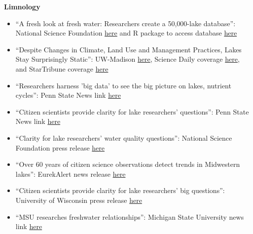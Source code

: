 \documentclass[10pt]{article}
\begin{document}
\begin{flushleft}
\textbf{Limnology}\\
\begin{itemize}
\item ``A fresh look at fresh water: Researchers create a 50,000-lake database'': National Science Foundation \href{https://www.nsf.gov/news/news_summ.jsp?cntn_id=243391&org=NSF&from=news}{here} and R package to access database \href{https://github.com/cont-limno/LAGOSNE}{here} 
\item ``Despite Changes in Climate, Land Use and Management Practices, Lakes Stay Surprisingly Static'': UW-Madison  \href{http://blog.limnology.wisc.edu/despite-changes-in-climate-land-use-and-management-practices-lakes-stay-surprisingly-static/}{here}, Science Daily coverage  \href{https://www.sciencedaily.com/releases/2017/08/170823184403.htm}{here}, and StarTribune coverage \href{http://m.startribune.com/minnesota-lakes-holding-their-own-against-pollution/441820303/?section=local}{here}
\item ``Researchers harness 'big data' to see the big picture on lakes, nutrient cycles'': Penn State News link \href{http://news.psu.edu/story/425689/2016/09/13/research/researchers-harness-big-data-see-big-picture-lakes-nutrient-cycles}{here}\\
\item ``Citizen scientists provide clarity for lake researchers' questions'': Penn State News link
\href{http://news.psu.edu/story/314178/2014/04/30/research/citizen-scientists-provide-clarity-lake-researchers-questions}{here} \\
\item ``Clarity for lake researchers' water quality questions'': National Science Foundation press release
\href{http://www.nsf.gov/discoveries/disc_summ.jsp?cntn_id=131238&org=NSF&from=news}{here} \\
\item ``Over 60 years of citizen science observations detect trends in Midwestern lakes'': EurekAlert news release
\href{http://www.eurekalert.org/pub_releases/2014-04/p-o6y042814.php}{here} \\
\item ``Citizen scientists provide clarity for lake researchers’ big questions'': University of Wisconsin press release
\href{http://www.news.wisc.edu/22805}{here}  \\
\item ``MSU researches freshwater relationships'': Michigan State University news link \href{http://www.statenews.com/index.php/article/2010/06/msu_researches_freshwater_relationships}{here}\\
\vspace{5pt}
\end{itemize}


\end{flushleft}
\end{document}
